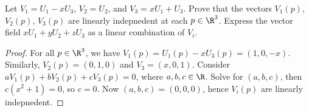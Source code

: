 \begin{exercise}[1.2.5]
    Let ${V}_{1}={U}_{1}-x{U}_{3}$, ${V}_{2}={U}_{2}$, and ${V}_{3}=x{U}_{1}+{U}_{3}$. Prove that the vectors ${V}_{1}(p)$, ${V}_{2}(p)$, ${V}_{3}(p)$ are linearly indepnedent at each $p\in{\R}^{3}$. Express the vector field $x{U}_{1}+y{U}_{2}+z{U}_{3}$ as a linear combination of ${V}_{i}$.
\end{exercise}
\begin{proof}
    For all $p\in{\R}^{3}$, we have ${V}_{1}(p)={U}_{1}(p)-x{U}_{3}(p)=(1,0,-x)$. Similarly, ${V}_{2}(p)=(0,1,0)$ and ${V}_{3}=(x,0,1)$. Consider $a{V}_{1}(p)+b{V}_{2}(p)+c{V}_{3}(p)=0$, where $a,b,c\in\R$. Solve for $(a,b,c)$, then $c({x}^{2}+1)=0$, so $c=0$. Now $(a,b,c)=(0,0,0)$, hence ${V}_{i}(p)$ are linearly indepnedent.
\end{proof}
